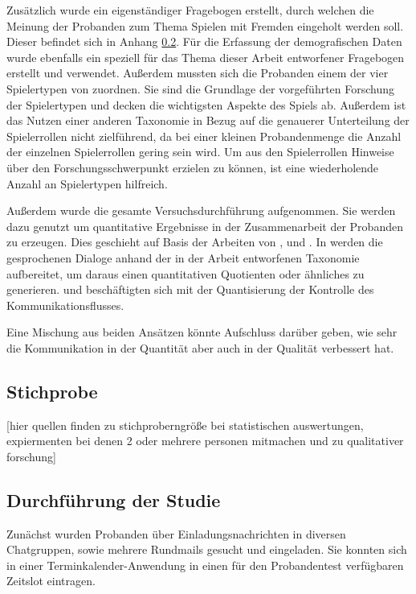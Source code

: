 Zusätzlich wurde ein eigenständiger Fragebogen erstellt, durch welchen die Meinung der Probanden zum Thema Spielen mit Fremden eingeholt werden soll. Dieser befindet sich in Anhang \ref{}. Für die Erfassung der demografischen Daten wurde ebenfalls ein speziell für das Thema dieser Arbeit entworfener Fragebogen erstellt und verwendet. Außerdem mussten sich die Probanden einem der vier Spielertypen von \cite{bartle_hearts_1996} zuordnen. Sie sind die Grundlage der vorgeführten Forschung der Spielertypen und decken die wichtigsten Aspekte des Spiels ab. Außerdem ist das Nutzen einer anderen Taxonomie in Bezug auf die genauerer Unterteilung der Spielerrollen nicht zielführend, da bei einer kleinen Probandenmenge die Anzahl der einzelnen Spielerrollen gering sein wird. Um aus den Spielerrollen Hinweise über den Forschungsschwerpunkt erzielen zu können, ist eine wiederholende Anzahl an Spielertypen hilfreich.

Außerdem wurde die gesamte Versuchsdurchführung aufgenommen. Sie werden dazu genutzt um quantitative Ergebnisse in der Zusammenarbeit der Probanden zu erzeugen. Dies geschieht auf Basis der Arbeiten von \cite{baykal_collaboration_2023}, \cite{nasir_cooperative_2013} und \cite{nasir_effect_2015}. In \cite{baykal_collaboration_2023} werden die gesprochenen Dialoge anhand der in der Arbeit entworfenen Taxonomie aufbereitet, um daraus einen quantitativen Quotienten oder ähnliches zu generieren. \cite{nasir_cooperative_2013} und \cite{nasir_effect_2015} beschäftigten sich mit der Quantisierung der Kontrolle des Kommunikationsflusses.

Eine Mischung aus beiden Ansätzen könnte Aufschluss darüber geben, wie sehr die Kommunikation in der Quantität aber auch in der Qualität verbessert hat.

\subsection{Stichprobe}
[hier quellen finden zu stichproberngröße bei statistischen auswertungen, expiermenten bei denen 2 oder mehrere personen mitmachen und zu qualitativer forschung]

\subsection{Durchführung der Studie}
Zunächst wurden Probanden über Einladungsnachrichten in diversen Chatgruppen, sowie mehrere Rundmails gesucht und eingeladen. Sie konnten sich in einer Terminkalender-Anwendung in einen für den Probandentest verfügbaren Zeitslot eintragen.

